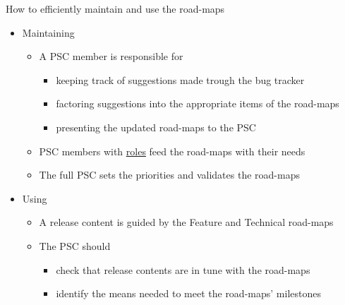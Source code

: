 \documentclass[8pt]{beamer}
\begin{document}
\begin{frame}[label=sec-8]{How to efficiently maintain and use the road-maps}
\begin{itemize}
\item Maintaining
\begin{itemize}
\item A PSC member is responsible for
\begin{itemize}
\item keeping track of suggestions made trough the bug tracker
\item factoring suggestions into the appropriate items of the road-maps
\item presenting the updated road-maps to the PSC
\end{itemize}
\item PSC members with \href{http://wiki.orfeo-toolbox.org/index.php/Project_Steering_Committee#Current_members_and_roles}{roles} feed the road-maps with their needs
\item The full PSC sets the priorities and validates the road-maps
\end{itemize}
\item Using
\begin{itemize}
\item A release content is guided by the Feature and Technical road-maps
\item The PSC should
\begin{itemize}
\item check that release contents are in tune with the road-maps
\item identify the means needed to meet the road-maps' milestones
\end{itemize}
\end{itemize}
\end{itemize}
\end{frame}
\end{document}
